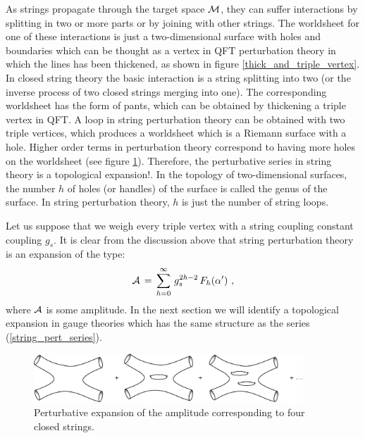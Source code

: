 \documentclass[12pt,notitlepage]{article}
\newcommand{\beq}{\begin{equation}}
\newcommand{\eeq}{\end{equation}}
\begin{document}
As strings propagate through the target space ${\cal M}$, they can suffer interactions by splitting in two or more parts or by joining with other strings. The worldsheet for one of these interactions is just a two-dimensional surface with holes and boundaries which can be thought as a vertex in QFT perturbation theory in which the lines has been thickened, as shown in figure \ref{thick_and_triple_vertex}. In closed string theory the basic interaction is a string splitting into two (or the inverse process of two closed strings merging into one). The corresponding worldsheet has the form of pants, which can be obtained by thickening a triple vertex in QFT. A loop in string perturbation theory can be obtained with two triple vertices, which produces a worldsheet which is a Riemann surface with a hole. Higher order terms in perturbation theory correspond to having more holes on the worldsheet (see figure \ref{stringperturbation}). Therefore, the perturbative series in string theory is a topological expansion!. In the topology of two-dimensional  surfaces, the number $h$ of holes (or handles) of the surface  is called the genus of the surface. In string perturbation theory, $h$ is just the number of string loops. 

Let us suppose that we weigh every triple vertex with a string coupling constant  coupling $g_s$.  It is clear from the discussion above that  string perturbation theory is an expansion of the type:
\beq
{\cal A}\,=\,\sum_{h=0}^{\infty}\, g_s^{2h-2}\,F_h(\alpha')\,\,,
\label{string_pert_series}
\eeq
where ${\cal A}$ is some amplitude. In the next section we will identify a topological expansion in gauge theories which has the same structure as the series (\ref{string_pert_series}). 

\begin{figure}[ht]
\center
\includegraphics[width=0.9\textwidth]{flotadorespatitas.pdf}
\caption{Perturbative expansion of the amplitude corresponding to four closed strings. } 
\label{stringperturbation}
\end{figure}
\end{document}

